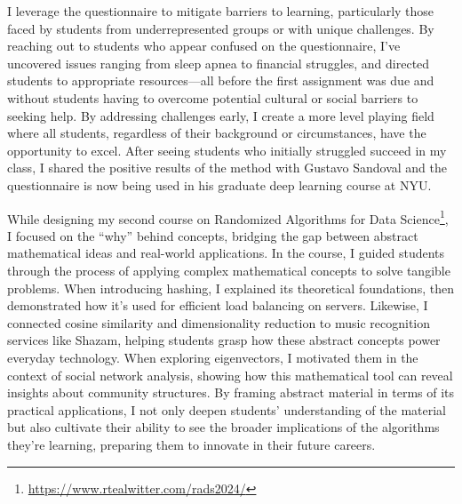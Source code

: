 \documentclass[11pt]{article}
\begin{document}
{I leverage the questionnaire to mitigate barriers to learning, particularly those faced by students from underrepresented groups or with unique challenges. By reaching out to students who appear confused on the questionnaire, I've uncovered issues ranging from sleep apnea to financial struggles, and directed students to appropriate resources—all before the first assignment was due and without students having to overcome potential cultural or social barriers to seeking help. By addressing challenges early, I create a more level playing field where all students, regardless of their background or circumstances, have the opportunity to excel. After seeing students who initially struggled succeed in my class, I shared the positive results of the method with Gustavo Sandoval and the questionnaire is now being used in his graduate deep learning course at NYU.

While designing my second course on Randomized Algorithms for Data Science\footnote{\url{https://www.rtealwitter.com/rads2024/}}, I focused on the ``why'' behind concepts, bridging the gap between abstract mathematical ideas and real-world applications. In the course, I guided students through the process of applying complex mathematical concepts to solve tangible problems. When introducing hashing, I explained its theoretical foundations, then demonstrated how it's used for efficient load balancing on servers. Likewise, I connected cosine similarity and dimensionality reduction to music recognition services like Shazam, helping students grasp how these abstract concepts power everyday technology. When exploring eigenvectors, I motivated them in the context of social network analysis, showing how this mathematical tool can reveal insights about community structures. By framing abstract material in terms of its practical applications, I not only deepen students' understanding of the material but also cultivate their ability to see the broader implications of the algorithms they're learning, preparing them to innovate in their future careers.


}
\end{document}
